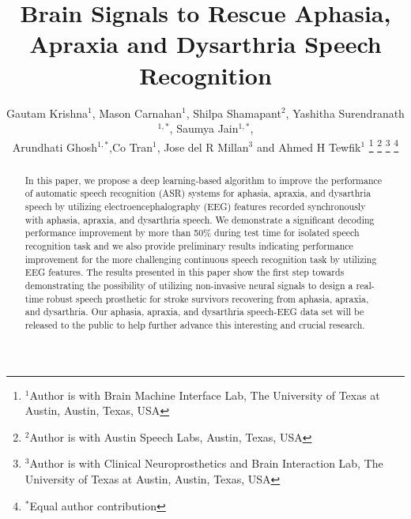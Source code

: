 \documentclass[letterpaper, 10 pt, conference]{ieeeconf}  %
\title{\LARGE \bf
Brain Signals to Rescue Aphasia, Apraxia and Dysarthria Speech Recognition 
}
\author{Gautam Krishna$^{1}$, Mason Carnahan$^{1}$, Shilpa Shamapant$^{2}$, Yashitha Surendranath$^{1,*}$, Saumya Jain$^{1,*}$,\\
Arundhati Ghosh$^{1,*}$,Co Tran$^{1}$, Jose del R 
Millan$^{3}$ and Ahmed H Tewfik$^{1}$%
\thanks{$^{1}$Author is with Brain Machine Interface Lab, The University of Texas at Austin,
        Austin, Texas, USA
        {}}%
\thanks{$^{2}$Author is with Austin Speech Labs, Austin,
        Texas, USA
        {}}%
\thanks{$^{3}$Author is with Clinical Neuroprosthetics and Brain Interaction Lab, The University of Texas at Austin,
        Austin, Texas, USA
        {}}%
\thanks{$^{*}$Equal author contribution 
        {}}%
}
\begin{document}
\maketitle
\thispagestyle{empty}
\pagestyle{empty}


\begin{abstract}

In this paper, we propose a deep learning-based algorithm to improve the performance of automatic speech recognition (ASR) systems for aphasia, apraxia, and dysarthria speech by utilizing electroencephalography (EEG) features recorded synchronously with aphasia, apraxia, and dysarthria speech. We demonstrate a significant decoding performance improvement by more than 50\% during test time for isolated speech recognition task and we also provide preliminary results indicating performance improvement for the more challenging continuous speech recognition task by utilizing EEG features. The results presented in this paper show the first step towards demonstrating the possibility of utilizing non-invasive neural signals to design a real-time robust speech prosthetic for stroke survivors recovering from aphasia, apraxia, and dysarthria. Our aphasia, apraxia, and dysarthria speech-EEG data set will be released to the public to help further advance this interesting and crucial research. 

\end{abstract}


\end{document}
